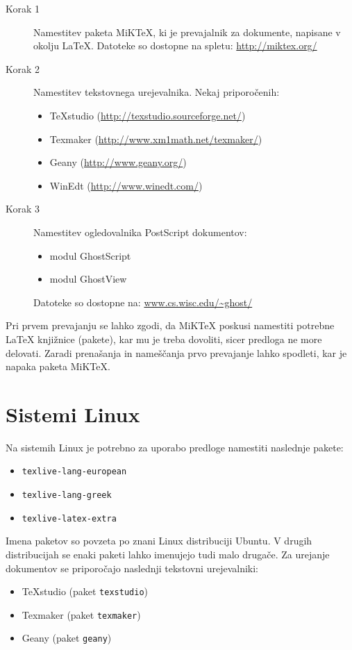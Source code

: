 \documentclass[a4paper,twoside,openright,12pt,slovene]{book}
\begin{document}
\begin{description}
    \item[Korak 1] Namestitev paketa MiKTeX, ki je prevajalnik za dokumente, napisane v okolju LaTeX. Datoteke so dostopne na spletu: \url{http://miktex.org/}
    \item[Korak 2] Namestitev tekstovnega urejevalnika. Nekaj priporočenih:
    \begin{itemize}[noitemsep]
        \item TeXstudio (\url{http://texstudio.sourceforge.net/})
        \item Texmaker (\url{http://www.xm1math.net/texmaker/})
        \item Geany (\url{http://www.geany.org/})
        \item WinEdt (\url{http://www.winedt.com/})
    \end{itemize}
    \item[Korak 3] Namestitev ogledovalnika PostScript dokumentov:
    \begin{itemize}[noitemsep]
        \item modul GhostScript
        \item modul GhostView
    \end{itemize}
    Datoteke so dostopne na: \url{www.cs.wisc.edu/~ghost/}
\end{description}

Pri prvem prevajanju se lahko zgodi, da MiKTeX poskusi namestiti potrebne LaTeX knjižnice (pakete), kar mu je treba dovoliti, sicer predloga ne more delovati. Zaradi prenašanja in nameščanja prvo prevajanje lahko spodleti, kar je napaka paketa MiKTeX.

\section{Sistemi Linux}

Na sistemih Linux je potrebno za uporabo predloge namestiti naslednje pakete:

\begin{itemize}[noitemsep]
    \item \texttt{texlive-lang-european}
    \item \texttt{texlive-lang-greek}
    \item \texttt{texlive-latex-extra}
\end{itemize}

Imena paketov so povzeta po znani Linux distribuciji Ubuntu. V drugih distribucijah se enaki paketi lahko imenujejo tudi malo drugače. Za urejanje dokumentov se priporočajo naslednji tekstovni urejevalniki:

\begin{itemize}[noitemsep]
    \item TeXstudio (paket \texttt{texstudio})
    \item Texmaker (paket \texttt{texmaker})
    \item Geany (paket \texttt{geany})
\end{itemize}
\end{document}
